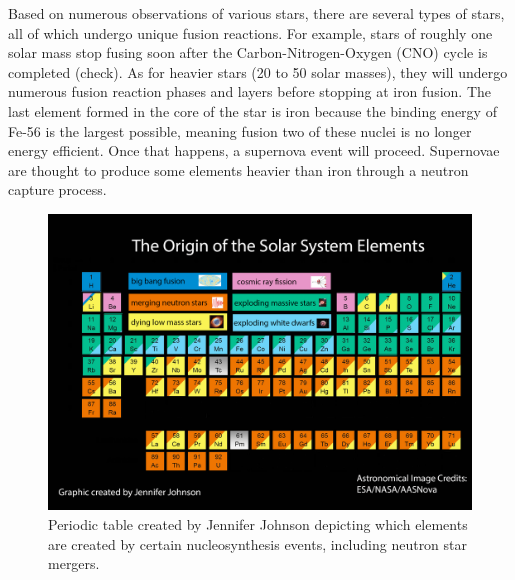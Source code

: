 \documentclass[11pt,a4paper]{article}
\begin{document}
Based on numerous observations of various stars, there are several types of stars, all of which undergo unique fusion reactions. For example, stars of roughly one solar mass stop fusing soon after the Carbon-Nitrogen-Oxygen (CNO) cycle is completed (check). As for heavier stars (20 to 50 solar masses), they will undergo numerous fusion reaction phases and layers before stopping at iron fusion. The last element formed in the core of the star is iron because the binding energy of Fe-56 is the largest possible, meaning fusion two of these nuclei is no longer energy efficient. Once that happens, a supernova event will proceed. Supernovae are thought to produce some elements heavier than iron through a neutron capture process. 

\begin{figure}[h!]
  \includegraphics[width=1\textwidth]{periodic_table.png}
  \caption{Periodic table created by Jennifer Johnson depicting which elements are created by certain nucleosynthesis events, including neutron star mergers.}
\end{figure} 
\end{document}
